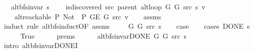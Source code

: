 \begin{isabellebody}
\ \ \ {\isachardoublequoteopen}alt{\isacharunderscore}{\kern0pt}bfs{\isacharunderscore}{\kern0pt}invar{\isacharprime}{\kern0pt}{\isacharprime}{\kern0pt}\ s{\isachardoublequoteclose}\isanewline
\ \ \ {\isachardoublequoteopen}{\isasymnot}\ is{\isacharunderscore}{\kern0pt}discovered\ src\ {\isacharparenleft}{\kern0pt}parent\ {\isacharparenleft}{\kern0pt}alt{\isacharunderscore}{\kern0pt}loop\ G{}\ G{}\ src\ s{\isacharparenright}{\kern0pt}{\isacharparenright}{\kern0pt}\ v{\isachardoublequoteclose}\isanewline
\ \ \ {\isachardoublequoteopen}{\isasymnot}\ alt{\isacharunderscore}{\kern0pt}reachable\ P{\isacharprime}{\kern0pt}{\isacharprime}{\kern0pt}\ {\isacharparenleft}{\kern0pt}Not\ {\isasymcirc}\ P{\isacharprime}{\kern0pt}{\isacharprime}{\kern0pt}{\isacharparenright}{\kern0pt}\ {\isacharparenleft}{\kern0pt}G{\isachardot}{\kern0pt}E\ G{\isacharparenright}{\kern0pt}\ src\ v{\isachardoublequoteclose}\isanewline
%
\isadelimproof
\ \ %
\endisadelimproof
%
\isatagproof
{}\isamarkupfalse%
\ assms\isanewline
{}\isamarkupfalse%
\ {\isacharparenleft}{\kern0pt}induct\ rule{\isacharcolon}{\kern0pt}\ alt{\isacharunderscore}{\kern0pt}bfs{\isacharunderscore}{\kern0pt}induct{\isacharbrackleft}{\kern0pt}OF\ assms{\isacharparenleft}{\kern0pt}{}{\isacharparenright}{\kern0pt}{\isacharbrackright}{\kern0pt}{\isacharparenright}{\kern0pt}\isanewline
\ \ \isamarkupfalse%
\ {\isacharparenleft}{\kern0pt}{}\ G{}\ G{}\ src\ s{\isacharparenright}{\kern0pt}\isanewline
\ \ \isamarkupfalse%
\ {\isacharquery}{\kern0pt}case\isanewline
\ \ \isamarkupfalse%
\ {\isacharparenleft}{\kern0pt}cases\ {\isachardoublequoteopen}DONE\ s{\isachardoublequoteclose}{\isacharparenright}{\kern0pt}\isanewline
\ \ \ \ \isamarkupfalse%
\ True\isanewline
\ \ \ \ \isamarkupfalse%
\ {\isachardoublequoteopen}{}{\isachardot}{\kern0pt}prems{\isachardoublequoteclose}{\isacharparenleft}{\kern0pt}{}{\isacharparenright}{\kern0pt}\isanewline
\ \ \ \ \isamarkupfalse%
\ {\isachardoublequoteopen}alt{\isacharunderscore}{\kern0pt}bfs{\isacharunderscore}{\kern0pt}invar{\isacharunderscore}{\kern0pt}DONE{\isacharprime}{\kern0pt}\ G{}\ G{}\ src\ s{\isachardoublequoteclose}\isanewline
\ \ \ \ \ \ \isamarkupfalse%
\ {\isacharparenleft}{\kern0pt}intro\ alt{\isacharunderscore}{\kern0pt}bfs{\isacharunderscore}{\kern0pt}invar{\isacharunderscore}{\kern0pt}DONE{\isacharprime}{\kern0pt}I{\isacharparenright}{\kern0pt}\isanewline

\end{isabellebody}
